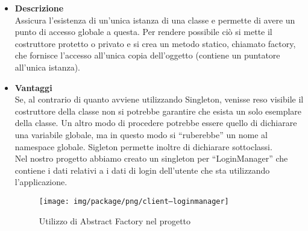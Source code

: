 		\begin{itemize}
			\item \textbf{Descrizione}\\ 
			 Assicura l'esistenza di un'unica istanza di una classe e permette di avere un punto di accesso globale a questa.
			 Per rendere possibile ciò si mette il costruttore protetto o privato e si crea un metodo statico, chiamato factory, che fornisce l’accesso all'unica copia dell’oggetto (contiene un puntatore all’unica istanza).			 
			 \item \textbf{Vantaggi}\\ 
			 Se, al contrario di quanto avviene utilizzando Singleton, venisse reso visibile il costruttore della classe non si potrebbe garantire che esista un solo esemplare della classe. Un altro modo di procedere potrebbe essere quello di dichiarare una variabile globale, ma in questo modo si ``ruberebbe'' un nome al namespace globale.
			 Sigleton permette inoltre di dichiarare sottoclassi.			 
			 \utilizzo \\ 
			 Nel nostro progetto abbiamo creato un singleton per ``LoginManager'' che contiene i dati relativi a i dati di login dell'utente che sta utilizzando l'applicazione.
			 
			 	\begin{figure}[!h]
			 		\centering
			 		\texttt{[image: img/package/png/client--loginmanager]}  
			 		\caption{Utilizzo di Abstract Factory nel progetto}
			 	\end{figure}
			 
		\end{itemize}
		
		
		
